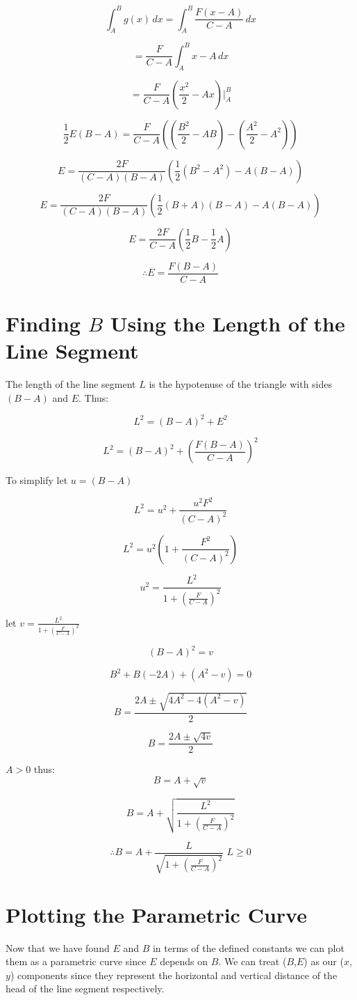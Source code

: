 \documentclass{article}
\begin{document}
\vspace{10 pt}

$$\int_{A}^{B}g(x) \,dx = \int_{A}^{B}\frac{F(x-A)}{C-A} \,dx$$

$$=\frac{F}{C-A}\int_{A}^{B}x-A \,dx$$

$$=\frac{F}{C-A}(\frac{x^2}{2}-Ax) \Big|_{A}^{B}$$

$$\frac{1}{2}E(B-A)=\frac{F}{C-A}((\frac{B^2}{2}-AB) - (\frac{A^2}{2}-A^2))$$

$$E = \frac{2F}{(C-A)(B-A)}(\frac{1}{2}(B^2-A^2)-A(B-A))$$

$$E=\frac{2F}{(C-A)(B-A)}(\frac{1}{2}(B+A)(B-A)-A(B-A))$$

$$E=\frac{2F}{C-A}(\frac{1}{2}B-\frac{1}{2}A)$$

$$\therefore \boxed{E=\frac{F(B-A)}{C-A}}$$

\section{Finding $B$ Using the Length of the Line Segment}

The length of the line segment $L$ is the hypotenuse of the triangle with sides $(B-A)$ and $E$. Thus:

$$L^2 = (B-A)^2+E^2$$

$$L^2=(B-A)^2+\left(\frac{F(B-A)}{C-A}\right)^2$$

To simplify let $u=(B-A)$

$$L^2=u^2+\frac{u^2F^2}{(C-A)^2}$$

$$L^2 = u^2\left(1+\frac{F^2}{(C-A)^2} \right)$$

$$u^2 = \frac{L^2}{1+\left(\frac{F}{C-A}\right)^2}$$

let $v=\frac{L^2}{1+\left(\frac{F}{C-A}\right)^2}$

$$(B-A)^2=v$$

$$B^2+B(-2A)+(A^2-v)=0$$

$$B=\frac{2A \pm \sqrt{4A^2-4(A^2-v)}}{2}$$

$$B=\frac{2A \pm \sqrt{4v}}{2}$$

$A>0$ thus:
$$B=A+\sqrt{v}$$

$$B=A+\sqrt{\frac{L^2}{1+\left(\frac{F}{C-A}\right)^2}}$$

$$\therefore \boxed{B=A+ \frac{L}{\sqrt{1+\left(\frac{F}{C-A}\right)^2}}} \,\, L \geq 0$$

\section{Plotting the Parametric Curve}
Now that we have found $E$ and $B$ in terms of the defined constants we can plot them as a parametric curve since $E$ depends on $B$. We can treat ($B$,$E$) as our ($x$,$y$) components since they represent the horizontal and vertical distance of the head of the line segment respectively.
\end{document}
